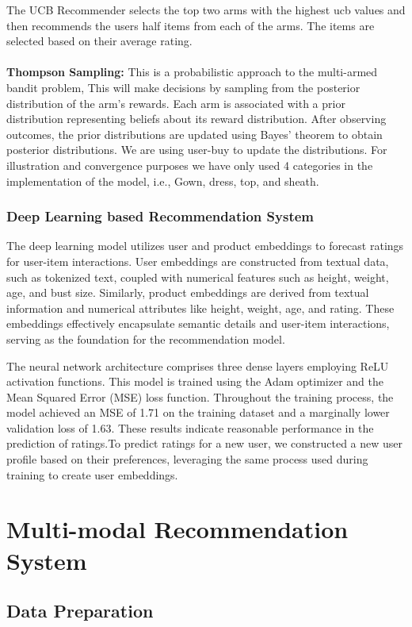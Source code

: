 \documentclass[conference]{IEEEtran}
\begin{document}
The UCB Recommender selects the top two arms with the highest ucb values and then recommends the users half items from each of the arms.
The items are selected based on their average rating.\\ \\
\textbf{Thompson Sampling:}
This is a probabilistic approach to the multi-armed bandit problem, This will make decisions by sampling from the posterior distribution of the arm's rewards. Each arm is associated with a prior distribution representing beliefs about its reward distribution. After observing outcomes, the prior distributions are updated using Bayes' theorem to obtain posterior distributions. We are using user-buy to update the distributions. For illustration and convergence purposes we have only used 4 categories in the implementation of the model, i.e., Gown, dress, top, and sheath. 
\subsubsection{Deep Learning based Recommendation System}
The deep learning model utilizes user and product embeddings to forecast ratings for user-item interactions. User embeddings are constructed from textual data, such as tokenized text, coupled with numerical features such as height, weight, age, and bust size. Similarly, product embeddings are derived from textual information and numerical attributes like height, weight, age, and rating. These embeddings effectively encapsulate semantic details and user-item interactions, serving as the foundation for the recommendation model.

The neural network architecture comprises three dense layers employing ReLU activation functions. This model is trained using the Adam optimizer and the Mean Squared Error (MSE) loss function. Throughout the training process, the model achieved an MSE of 1.71 on the training dataset and a marginally lower validation loss of 1.63. These results indicate reasonable performance in the prediction of ratings.To predict ratings for a new user, we constructed a new user profile based on their preferences, leveraging the same process used during training to create user embeddings. 
\section{Multi-modal Recommendation System}

\subsection{Data Preparation}
\end{document}
